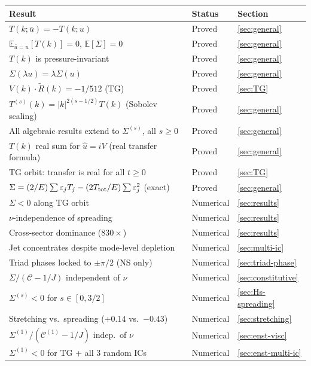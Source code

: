 \documentclass[11pt]{article}
\theoremstyle{definition}
\newcommand{\E}{\mathbb{E}}
\newcommand{\cC}{\mathcal{C}}
\begin{document}
\begin{center}
\renewcommand{\arraystretch}{1.2}
\begin{tabular}{@{}lll@{}}
\toprule
\textbf{Result} & \textbf{Status} & \textbf{Section} \\
\midrule
$T(k;\bar u) = -T(k;u)$
  & Proved & \ref{sec:general} \\
$\E_{\bar u=u}[T(k)]=0$, $\E[\Sigma]=0$
  & Proved & \ref{sec:general} \\
$T(k)$ is pressure-invariant
  & Proved & \ref{sec:general} \\
$\Sigma(\lambda u)=\lambda\Sigma(u)$
  & Proved & \ref{sec:general} \\
$V(k)\cdot\widetilde R(k)=-1/512$ (TG)
  & Proved & \ref{sec:TG} \\
$T^{(s)}(k)=|k|^{2(s-1/2)}T(k)$ (Sobolev scaling)
  & Proved & \ref{sec:general} \\
All algebraic results extend to $\Sigma^{(s)}$, all $s\geq 0$
  & Proved & \ref{sec:general} \\
$T(k)$ real sum for $\hat u=iV$ (real transfer formula)
  & Proved & \ref{sec:general} \\
TG orbit: transfer is real for all $t\geq 0$
  & Proved & \ref{sec:TG} \\
$\Sigma = (2/E)\sum\varepsilon_j T_j
  - (2T_{\rm tot}/E)\sum\varepsilon_j^2$ (exact)
  & Proved & \ref{sec:general} \\
$\Sigma<0$ along TG orbit
  & Numerical & \ref{sec:results} \\
$\nu$-independence of spreading
  & Numerical & \ref{sec:results} \\
Cross-sector dominance ($830\times$)
  & Numerical & \ref{sec:results} \\
Jet concentrates despite mode-level depletion
  & Numerical & \ref{sec:multi-ic} \\
Triad phases locked to $\pm\pi/2$ (NS only)
  & Numerical & \ref{sec:triad-phase} \\
$\Sigma/(\cC-1/J)$ independent of $\nu$
  & Numerical & \ref{sec:constitutive} \\
$\Sigma^{(s)}<0$ for $s\in[0,3/2]$
  & Numerical & \ref{sec:Hs-spreading} \\
Stretching vs.\ spreading ($+0.14$ vs.\ $-0.43$)
  & Numerical & \ref{sec:stretching} \\
$\Sigma^{(1)}/(\cC^{(1)}-1/J)$ indep.\ of $\nu$
  & Numerical & \ref{sec:enst-visc} \\
$\Sigma^{(1)}<0$ for TG + all 3 random ICs
  & Numerical & \ref{sec:enst-multi-ic} \\

\end{tabular}
\end{center}
\end{document}
